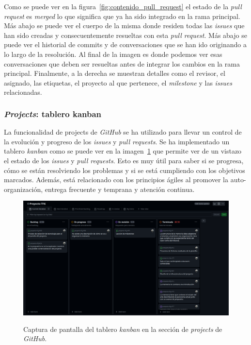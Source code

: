 Como se puede ver en la figura~\ref{fig:contenido_pull_request} el estado de la \textit{pull request} es \textit{merged} lo que significa que ya ha sido integrado en la rama principal. Más abajo se puede ver el cuerpo de la misma donde residen todas las \textit{issues} que han sido creadas y consecuentemente resueltas con esta \textit{pull request}. Más abajo se puede ver el historial de commits y de conversaciones que se han ido originando a lo largo de la resolución. Al final de la imagen es donde podemos ver esas conversaciones que deben ser resueltas antes de integrar los cambios en la rama principal. Finalmente, a la derecha se muestran detalles como el revisor, el asignado, las etiquetas, el proyecto al que pertenece, el \textit{milestone} y las \textit{issues} relacionadas.

\subsubsection{\textit{Projects}: tablero kanban}

La funcionalidad de projects de \textit{GitHub} se ha utilizado para llevar un control de la evolución y progreso de los \textit{issues} y \textit{pull requests}. Se ha implementado un tablero \textit{kanban} como se puede ver en la imagen~\ref{fig:tablero_kanban} que permite ver de un vistazo el estado de los \textit{issues} y \textit{pull requests}. Esto es muy útil para saber si se progresa, cómo se están resolviendo los problemas y si se está cumpliendo con los objetivos marcados. Además, está relacionado con los principios ágiles al promover la auto-organización, entrega frecuente y temprana y atención continua.

\begin{figure}[H]
    \caption{Captura de pantalla del tablero \textit{kanban} en la sección de \textit{projects} de \textit{GitHub}.}
    \centering
    \vspace*{0.5cm}
    \includegraphics[scale=0.2]{figuras/projects_github.png}\label{fig:tablero_kanban}
\end{figure}

